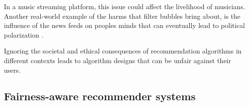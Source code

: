 In a music streaming platform, this issue could affect the livelihood of musicians. Another real-world example of the harms that filter bubbles bring about, is the influence of the news feeds on peoples minds that can eventually lead to political polarization \cite{HONG2016777}.  


Ignoring the societal and ethical consequences of recommendation algorithms in different contexts leads to algorithm designs that can be unfair against their users.



    
    
    
    

\subsection{Fairness-aware recommender systems}

